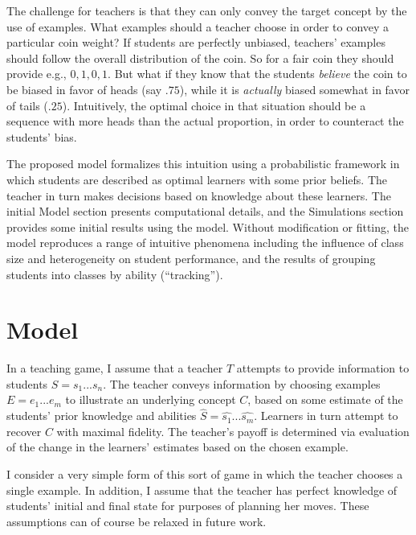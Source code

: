 \documentclass[10pt,letterpaper]{article}
\begin{document}
The challenge for teachers is that they can only convey the target concept by the use of examples. What examples should a teacher choose in order to convey a particular coin weight? If students are perfectly unbiased, teachers' examples should follow the overall distribution of the coin. So for a fair coin they should provide e.g., $0, 1, 0, 1$. But what if they know that the students \emph{believe} the coin to be biased in favor of heads (say $.75$), while it is \emph{actually} biased somewhat in favor of tails ($.25$). Intuitively, the optimal choice in that situation should be a sequence with more heads than the actual proportion, in order to counteract the students' bias.

The proposed model formalizes this intuition using a probabilistic framework in which students are described as optimal learners with some prior beliefs.  The teacher in turn makes decisions based on knowledge about these learners. The initial Model section presents computational details, and the Simulations section provides some initial results using the model. Without modification or fitting, the model reproduces a range of intuitive phenomena including the influence of class size and heterogeneity on student performance, and the results of grouping students into classes by ability (``tracking''). 

\section{Model}

In a teaching game, I assume that a teacher $T$ attempts to provide information to students $S = {s_1 ... s_n}$. The teacher conveys information by choosing examples $E = {e_1 ... e_m}$ to illustrate an underlying concept $C$, based on some estimate of the students' prior knowledge and abilities $\hat{S} = {\hat{s_1} ... \hat{s_m}}$. Learners in turn attempt to recover $C$ with maximal fidelity. The teacher's payoff is determined via evaluation of the change in the learners' estimates based on the chosen example.

I consider a very simple form of this sort of game in which the teacher chooses a single example. In addition, I assume that the teacher has perfect knowledge of students' initial and final state for purposes of planning her moves. These assumptions can of course be relaxed in future work.
\end{document}
